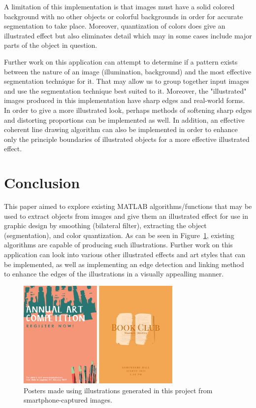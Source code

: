 \documentclass{article}
\begin{document}
A limitation of this implementation is that images must have a solid colored background with no other objects or colorful backgrounds in order for accurate segmentation to take place. Moreover, quantization of colors does give an illustrated effect but also eliminates detail which may in some cases include major parts of the object in question. 

Further work on this application can attempt to determine if a pattern exists between the nature of an image (illumination, background) and the most effective segmentation technique for it. That may allow us to group together input images and use the segmentation technique best suited to it. Moreover, the "illustrated" images produced in this implementation have sharp edges and real-world forms. In order to give a more illustrated look, perhaps methods of softening sharp edges and distorting proportions can be implemented as well. In addition, an effective coherent line drawing algorithm can also be implemented in order to enhance only the principle boundaries of illustrated objects for a more effective illustrated effect. 

\section{Conclusion}
\label{sec:conclusion}

This paper aimed to explore existing MATLAB algorithms/functions that may be used to extract objects from images and give them an illustrated effect for use in graphic design by smoothing (bilateral filter), extracting the object (segmentation), and color quantization. As can be seen in Figure~\ref{posters}, existing algorithms are capable of producing such illustrations. Further work on this application can look into various other illustrated effects and art styles that can be implemented, as well as implementing an edge detection and linking method to enhance the edges of the illustrations in a visually appealling manner.

\begin{figure}[H]
  \begin{minipage}[b]{1.0\linewidth}
    \centering
    \centerline{\includegraphics[width=8.0cm]{Figures/posters2.png}}
  \end{minipage}
  \caption{Posters made using illustrations generated in this project from smartphone-captured images.}
  \label{posters}
\end{figure}
\end{document}
